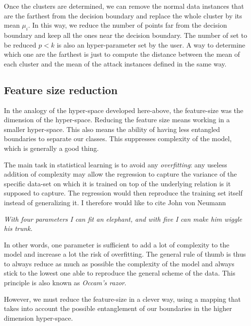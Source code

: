 Once the clusters are determined, we can remove the normal data instances that are the farthest from the decision boundary and replace the whole cluster by its mean $\mu_i$. In this way, we reduce the number of points far from the decision boundary and keep all the ones near the decision boundary. The number of set to be reduced $p<k$ is also an hyper-parameter set by the user. A way to determine which one are the farthest is just to compute the distance between the mean of each cluster and the mean of the attack instances defined in the same way.

\subsection{Feature size reduction}
In the analogy of the hyper-space developed here-above, the feature-size was the dimension of the hyper-space. Reducing the feature size means working in a smaller hyper-space. This also means the ability of having less entangled boundaries to separate our classes. This suppresses complexity of the model, which is generally a good thing.

The main task in statistical learning is to avoid any \emph{overfitting}: any useless addition of complexity may allow the regression to capture the variance of the specific data-set on which it is trained on top of the underlying relation is it supposed to capture. The regression would then reproduce the training set itself instead of generalizing it. I therefore would like to cite John von Neumann
\begin{displayquote}
\emph{With four parameters I can fit an elephant, and with five I can make him wiggle his trunk.}
\end{displayquote}

In other words, one parameter is sufficient to add a lot of complexity to the model and increase a lot the risk of overfitting. The general rule of thumb is thus to always reduce as much as possible the complexity of the model and always stick to the lowest one able to reproduce the general scheme of the data. This principle is also known as \emph{Occam's razor}.

However, we must reduce the feature-size in a clever way, using a mapping that takes into account the possible entanglement of our boundaries in the higher dimension hyper-space.

